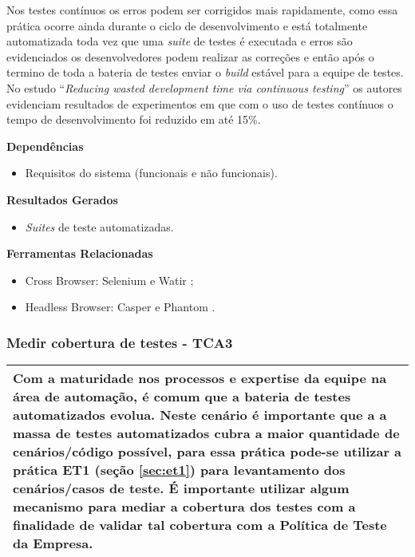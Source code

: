 Nos testes contínuos os erros podem ser corrigidos mais rapidamente, como essa prática ocorre ainda durante o ciclo de desenvolvimento e está totalmente automatizada toda vez que uma \textit{suite} de testes é executada e erros são evidenciados os desenvolvedores podem realizar as correções e então após o termino de toda a bateria de testes enviar o \textit{build} estável para a equipe de testes. No estudo “\textit{Reducing wasted development time via continuous testing}” \cite{salf2003} os autores evidenciam resultados de experimentos em que com o uso de testes contínuos o tempo de desenvolvimento foi reduzido em até 15\%.


\textbf{Dependências}
\begin{itemize}
    \item Requisitos do sistema (funcionais e não funcionais).
\end{itemize}

\textbf{Resultados Gerados}
\begin{itemize}
    \item \textit{Suites} de teste automatizadas.

\end{itemize}

\textbf{Ferramentas Relacionadas}
\begin{itemize}
    \item Cross Browser: Selenium \cite{Selenium} e Watir \cite{Watir};
    \item Headless Browser: Casper \cite{Casper} e Phantom \cite{Phantom}.
\end{itemize}


\subsubsection{Medir cobertura de testes - TCA3}
\label{sec:tca3}

\begin{table}[H]
\centering
\begin{tabular}{|p{130mm}|}
\hline
Com a maturidade nos processos e expertise da equipe na área de automação, é comum que a bateria de testes automatizados evolua. Neste cenário é importante que a a massa de testes automatizados cubra a maior quantidade de cenários/código possível, para essa prática pode-se utilizar a prática ET1 (seção \ref{sec:et1}) para levantamento dos cenários/casos de teste.
É importante utilizar algum mecanismo para mediar a cobertura dos testes com a finalidade de validar tal cobertura com a Política de Teste da Empresa.\\ 
\hline
\end{tabular}
\end{table}

